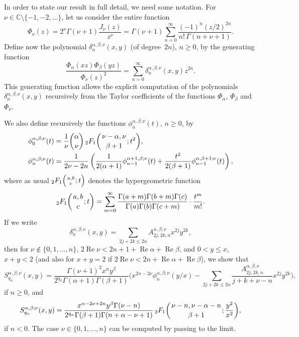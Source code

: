 \documentclass[10pt,leqno,a4paper]{article}
\theoremstyle{plain}
\newcommand{\CC}{\mathbb{C}}
\renewcommand{\Re}{\operatorname{Re}}
\numberwithin{equation}{section}
\newcommand{\FF}[3]{{}_{2}F_{1}%
  \mathopen{}\left(\genfrac{}{}{0pt}{}{#1}{#2};#3\right)\mathclose{}}
\begin{document}
In order to state our result in full detail, we need some notation. For $\nu \in \CC \setminus \{-1,-2,\dots \}$, let us consider the entire function
\begin{equation}
\label{def:Phibeta}
  \Phi_\nu(z) = 2^\nu \Gamma(\nu+1) \frac{J_\nu(z)}{z^\nu}
  = \Gamma(\nu+1) \sum_{n=0}^\infty \frac{(-1)^n (z/2)^{2n}}{n!\, \Gamma(n+\nu+1)}.
\end{equation}
Define now the polynomial $\delta_n^{\alpha,\beta;\nu}(x,y)$ (of degree~$2n$), $n\geq 0$, by the generating function
\[
   \frac{\Phi_{\alpha}(xz) \Phi_{\beta}(yz)}{\Phi_\nu(z)^2}
   = \sum_{n=0}^\infty \delta_n^{\alpha,\beta;\nu}(x,y)z^{2n}.
\]
This generating function allows the explicit computation of the polynomials $\delta_n^{\alpha,\beta;\nu}(x,y)$ recursively from the Taylor coefficients of the functions $\Phi_\alpha$, $\Phi_\beta$ and~$\Phi_\nu$.

We also define recursively the functions $\phi_n^{\alpha,\beta;\nu}(t)$, $n\geq 0$, by
\begin{align}
\label{hp1}
   \phi_0^{\alpha,\beta;\nu}(t)
   &= \frac{1}{\nu} \binom{\alpha}{\nu}\, \FF{\nu-\alpha,\nu}{\beta+1}{t^2},
   \\
\label{hp2}
   \phi_n^{\alpha,\beta;\nu}(t)
   &= \frac{1}{2\nu-2n}
   \left(
   \frac{1}{2(\alpha+1)} \phi_{n-1}^{\alpha+1,\beta;\nu}(t)
   + \frac{t^2}{2(\beta+1)} \phi_{n-1}^{\alpha,\beta+1;\nu}(t)
   \right),
\end{align}
where as usual $\FF{a,b}{c}{t}$ denotes the hypergeometric function
\[
   \FF{a,b}{c}{t} = \sum_{m=0}^{\infty}
   \frac{\Gamma(a+m) \Gamma(b+m) \Gamma(c)}{\Gamma(a) \Gamma(b) \Gamma(c+m)}
   \cdot \frac{t^m}{m!}.
\]
If we write
\[
   \delta_n^{\alpha,\beta;\nu}(x,y)
   = \sum_{2j + 2k \leq 2n} A_{2j,2k,n}^{\alpha,\beta;\nu} x^{2j} y^{2k},
\]
then for $\nu \notin \{0,1,\dots, n\}$, $2\Re\nu < 2n + 1 + \Re\alpha + \Re\beta$, and $0 < y \leq x$, $x+y<2$ (and also for $x+y=2$ if $2\Re \nu <2n+\Re \alpha+\Re \beta$), we show that
\begin{equation}
\label{sod2i}
   S_{q_n}^{\alpha,\beta;\nu}(x,y)
   = \frac{\Gamma(\nu+1)^2 x^\alpha y^\beta}{2^{q_0}\Gamma(\alpha+1)\Gamma(\beta+1)}
   \bigg( x^{2n-2\nu} \phi_{n}^{\alpha,\beta;\nu}(y/x)
   - \sum_{2j + 2k \leq 2n}
   \frac{A_{2j,2k,n}^{\alpha,\beta;\nu}}{j+k+\nu - n} x^{2j} y^{2k}
   \bigg),
\end{equation}
if $n\geq 0$, and
\begin{equation}
\label{sod22}
   S_{q_n}^{\alpha,\beta;\nu}(x,y)
   = \frac{x^{\alpha-2\nu+2n}y^\beta\Gamma(\nu-n)}{2^{q_n}\Gamma(\beta+1)\Gamma(n+\alpha-\nu+1)}
   \, \FF{\nu-n,\nu-\alpha-n}{\beta+1}{\frac{y^2}{x^2}},
\end{equation}
if $n<0$. The case $\nu\in\{0,1,\dots, n\}$ can be computed by passing to the limit.
\end{document}
